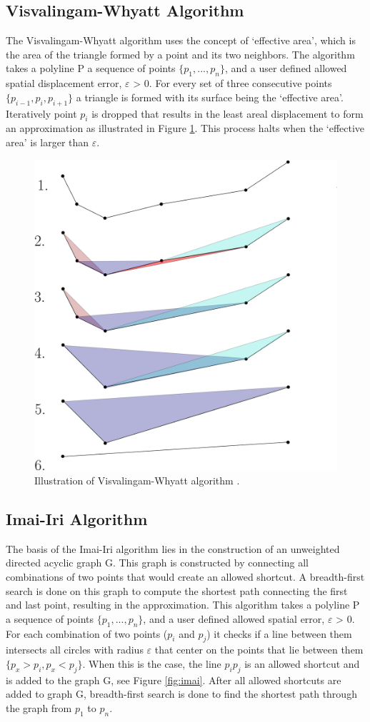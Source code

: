 \subsection{Visvalingam-Whyatt Algorithm}

The Visvalingam-Whyatt algorithm \cite{doi:10.1179/000870493786962263} uses the concept of ‘effective area’, which is the area of the triangle formed by a point and its two neighbors. The algorithm takes a polyline P a sequence of points $\{p_{1},..., p_{n}\}$, and a user defined allowed spatial displacement error, $\varepsilon$ > 0. For every set of three consecutive points $\{p_{i-1},p_{i},p_{i+1}\}$ a triangle is formed with its surface being the ‘effective area’. Iteratively point $p_{i}$ is dropped that results in the least areal displacement to form an approximation as illustrated in Figure \ref{fig:visv}. This process halts when the ‘effective area’ is larger than $\varepsilon$.

\begin{figure}[!ht]
    \centering
    \includegraphics[width=0.5\linewidth]{figures/visv.png}
    \caption[Illustration of Visvalingam-Whyatt
    algorithm \cite{van2017extensive}.] {Illustration of Visvalingam-Whyatt
    	algorithm \cite{van2017extensive}.
    }
    \label{fig:visv}
\end{figure}

\subsection{Imai-Iri Algorithm}
The basis of the Imai-Iri algorithm \cite{IMAI198631} lies in the construction of an unweighted directed acyclic graph G. This graph is constructed by connecting all combinations of two points that would create an allowed shortcut. A breadth-first search is done on this graph to compute the shortest path connecting the first and last point, resulting in the approximation. This algorithm takes a polyline P a sequence of points $\{p_{1},..., p_{n}\}$, and a user defined allowed spatial error, $\varepsilon $ > 0. For each combination of two points ($p_{i}$ and $p_{j}$) it checks if a line between them intersects all circles with radius $\varepsilon $ that center on the points that lie{\tiny {\tiny }} between them $\{p_{x} > p_{i},p_{x} < p_{j}\}$. When this is the case, the line $p_{i}p_{j}$ is an allowed shortcut and is added to the graph G, see Figure \ref{fig:imai}. After all allowed shortcuts are added to graph G, breadth-first search is done to find the shortest path through the graph from $p_{1}$ to $p_{n}$.

